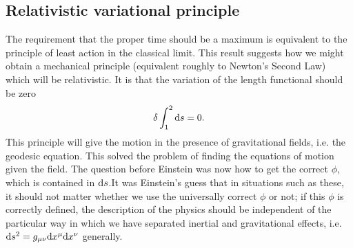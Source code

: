 \subsection{Relativistic variational principle}
The requirement that the proper time should be a maximum is equivalent to the principle of least action in the classical limit. This result suggests how we might obtain a mechanical principle (equivalent roughly to Newton's Second Law) which will be relativistic. It is that the variation of the length functional should be zero
\begin{equation}
\delta  \int_1^2 \mathrm{d} s=0.
\end{equation}
This principle will give the motion in the presence of gravitational fields, i.e. the geodesic equation. This solved the problem of finding the equations of motion given the field. The question before Einstein was now how to get the correct $\phi$, which is contained in $\mathrm{d} s$.It was Einstein's guess that in situations such as these, it should not matter whether we use the universally correct $\phi$ or not; if this $\phi$ is correctly defined, the description of the physics should be independent of the particular way in which we have separated inertial and gravitational effects, i.e. $\mathrm{d} s^2 = g_{\mu \nu} \mathrm{d} x^\mu \mathrm{d} x^\nu$ generally.
